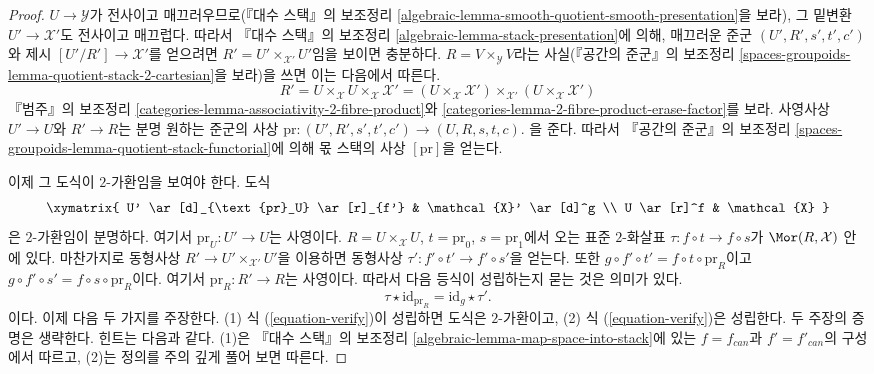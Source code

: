 \begin{proof}
$U \to \mathcal{Y}$가 전사이고 매끄러우므로(『대수 스택』의 보조정리
\ref{algebraic-lemma-smooth-quotient-smooth-presentation}을 보라),
그 밑변환 $U' \to \mathcal{X}'$도 전사이고 매끄럽다.
따라서 『대수 스택』의 보조정리
\ref{algebraic-lemma-stack-presentation}에 의해, 매끄러운 준군
$(U', R', s', t', c')$와 제시 $[U'/R'] \to \mathcal{X}'$를 얻으려면
$R' = U' \times_{\mathcal{X}'} U'$임을 보이면 충분하다.
$R = V \times_\mathcal{Y} V$라는 사실(『공간의 준군』의 보조정리
\ref{spaces-groupoids-lemma-quotient-stack-2-cartesian}을 보라)을 쓰면
이는 다음에서 따른다.
$$
R' =
U \times_\mathcal{X} U \times_\mathcal{X} \mathcal{X}' =
(U \times_\mathcal{X} \mathcal{X}')
\times_{\mathcal{X}'}
(U \times_\mathcal{X} \mathcal{X}')
$$
『범주』의 보조정리
\ref{categories-lemma-associativity-2-fibre-product}와
\ref{categories-lemma-2-fibre-product-erase-factor}를 보라.
사영사상 $U' \to U$와 $R' \to R$는 분명 원하는 준군의 사상
$\text{pr} : (U', R', s', t', c') \to (U, R, s, t, c)$.
을 준다. 따라서 『공간의 준군』의 보조정리
\ref{spaces-groupoids-lemma-quotient-stack-functorial}에 의해
몫 스택의 사상 $[\text{pr}]$을 얻는다.

\medskip\noindent
이제 그 도식이 $2$-가환임을 보여야 한다. 도식
$$
\xymatrix{
U' \ar[d]_{\text{pr}_U} \ar[r]_{f'} & \mathcal{X}' \ar[d]^g \\
U \ar[r]^f & \mathcal{X}
}
$$
은 $2$-가환임이 분명하다. 여기서 $\text{pr}_U : U' \to U$는 사영이다.
$R = U \times_\mathcal{X} U$, $t = \text{pr}_0$,
$s = \text{pr}_1$에서 오는 표준 $2$-화살표
$\tau : f \circ t \to f \circ s$가 $\Mor(R, \mathcal{X})$ 안에 있다.
마찬가지로 동형사상 $R' \to U' \times_{\mathcal{X}'} U'$을 이용하면
동형사상 $\tau' : f' \circ t' \to f' \circ s'$을 얻는다. 또한
$g \circ f' \circ t' = f \circ t \circ \text{pr}_R$이고
$g \circ f' \circ s' = f \circ s \circ \text{pr}_R$이다. 여기서
$\text{pr}_R : R' \to R$는 사영이다. 따라서 다음 등식이 성립하는지
묻는 것은 의미가 있다.
\begin{equation}
\label{equation-verify}
\tau \star \text{id}_{\text{pr}_R} = \text{id}_g \star \tau'.
\end{equation}
이다. 이제 다음 두 가지를 주장한다. (1) 식 (\ref{equation-verify})이
성립하면 도식은 $2$-가환이고, (2) 식 (\ref{equation-verify})은 성립한다.
두 주장의 증명은 생략한다. 힌트는 다음과 같다. (1)은 『대수 스택』의 보조정리
\ref{algebraic-lemma-map-space-into-stack}에 있는
$f = f_{can}$과 $f' = f'_{can}$의 구성에서 따르고,
(2)는 정의를 주의 깊게 풀어 보면 따른다.
\end{proof}

